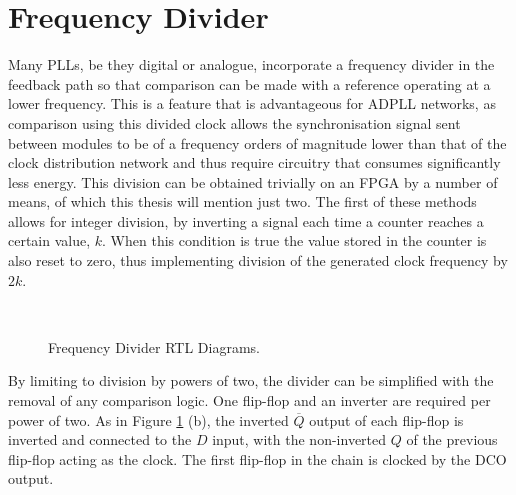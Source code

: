 \section{Frequency Divider}
Many \ac{PLL}s, be they digital or analogue, incorporate a frequency divider in the feedback path so that comparison can be made with a reference operating at a lower frequency. This is a feature that is advantageous for \ac{ADPLL} networks, as comparison using this divided clock allows the synchronisation signal sent between modules to be of a frequency orders of magnitude lower than that of the clock distribution network and thus require circuitry that consumes significantly less energy. This division can be obtained trivially on an \ac{FPGA} by a number of means, of which this thesis will mention just two. The first of these methods allows for integer division, by inverting a signal each time a counter reaches a certain value, $k$. When this condition is true the value stored in the counter is also reset to zero, thus implementing division of the generated clock frequency by $2k$.
\begin{figure}[h]%
	\centering
	\\
	\caption[Frequency Divider \ac{RTL} Diagrams]{Frequency Divider \ac{RTL} Diagrams.}
	\label{fig:divs}
\end{figure}
By limiting to division by powers of two, the divider can be simplified with the removal of any comparison logic. One flip-flop and an inverter are required per power of two. As in Figure \ref{fig:divs} (b), the inverted $\overline{Q}$ output of each flip-flop is inverted and connected to the $D$ input, with the non-inverted $Q$ of the previous flip-flop acting as the clock. The first flip-flop in the chain is clocked by the \ac{DCO} output. 

